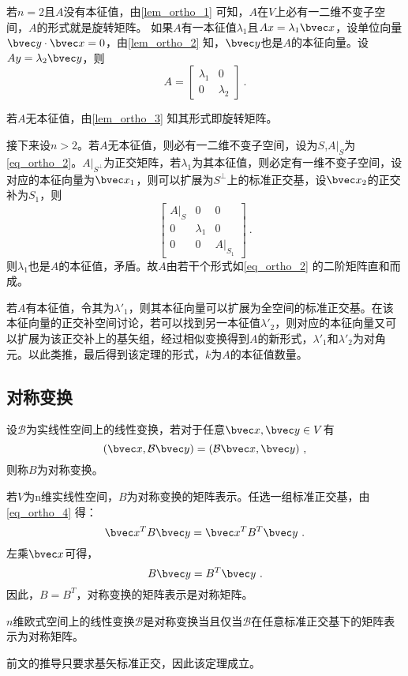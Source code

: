 若$n=2$且$A$没有本征值，由\autoref{lem_ortho_1} 可知，$A$在$V$上必有一二维不变子空间，$A$的形式就是旋转矩阵。
如果$A$有一本征值$\lambda_1$且$Ax=\lambda_1 \bvec x$，设单位向量$\bvec y\cdot \bvec x=0$，由\autoref{lem_ortho_2} 知，$\bvec y$也是$A$的本征向量。设$Ay=\lambda_2 \bvec y$，则
\begin{equation}
A=\left[\begin{array}{rr}
\lambda_1&0\\
0&\lambda_2
\end{array}
\right]~.
\end{equation}

若$A$无本征值，由\autoref{lem_ortho_3} 知其形式即旋转矩阵。

接下来设$n>2$。若$A$无本征值，则必有一二维不变子空间，设为$S$,$A|_{S}$为\autoref{eq_ortho_2}。$A|_{S^{\bot}}$为正交矩阵，若$\lambda_1$为其本征值，则必定有一维不变子空间，设对应的本征向量为$\bvec x_1$，则可以扩展为$S^{\bot}$上的标准正交基，设$\bvec x_2$的正交补为$S_1$，则
\begin{equation}
\left[\begin{array}{rrr}
A|_{S}&0&0\\
0&\lambda_1&0\\
0&0&A|_{S_1}
\end{array}
\right]~.
\end{equation}
则$\lambda_1$也是$A$的本征值，矛盾。故$A$由若干个形式如\autoref{eq_ortho_2} 的二阶矩阵直和而成。

若$A$有本征值，令其为$\lambda'_1$，则其本征向量可以扩展为全空间的标准正交基。在该本征向量的正交补空间讨论，若可以找到另一本征值$\lambda'_2$，则对应的本征向量又可以扩展为该正交补上的基矢组，经过相似变换得到$A$的新形式，$\lambda'_1$和$\lambda'_2$为对角元。以此类推，最后得到该定理的形式，$k$为$A$的本征值数量。
\subsection{对称变换}
\begin{definition}{}
设$\mathcal B$为实线性空间上的线性变换，若对于任意$\bvec x,\bvec y\in V$有
\begin{equation}\label{eq_ortho_4}
(\bvec x,\mathcal B\bvec y)=(\mathcal B\bvec x,\bvec y)~,
\end{equation}
则称$B$为对称变换。
\end{definition}

若$V$为n维实线性空间，$B$为对称变换的矩阵表示。任选一组标准正交基，由\autoref{eq_ortho_4} 得：
\begin{equation}
\bvec x^TB\bvec y=\bvec x^TB^T\bvec y~.
\end{equation}
左乘$\bvec x$可得，
\begin{equation}
B\bvec y=B^T\bvec y~.
\end{equation}
因此，$B=B^T$，对称变换的矩阵表示是对称矩阵。
\begin{theorem}{}
$n$维欧式空间上的线性变换$\mathcal B$是对称变换当且仅当$\mathcal B$在任意标准正交基下的矩阵表示为对称矩阵。
\end{theorem}
前文的推导只要求基矢标准正交，因此该定理成立。


